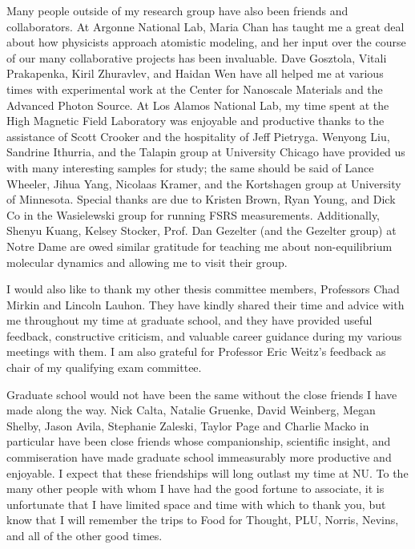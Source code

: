 \documentclass[12pt]{nuthesis}	%
\begin{document}
Many people outside of my research group have also been friends and collaborators. At Argonne National Lab, Maria Chan has taught me a great deal about how physicists approach atomistic modeling, and her input over the course of our many collaborative projects has been invaluable. Dave Gosztola, Vitali Prakapenka, Kiril Zhuravlev, and Haidan Wen have all helped me at various times with experimental work at the Center for Nanoscale Materials and the Advanced Photon Source. At Los Alamos National Lab, my time spent at the High Magnetic Field Laboratory was enjoyable and productive thanks to the assistance of Scott Crooker and the hospitality of Jeff Pietryga. Wenyong Liu, Sandrine Ithurria, and the Talapin group at University Chicago have provided us with many interesting samples for study; the same should be said of Lance Wheeler, Jihua Yang, Nicolaas Kramer, and the Kortshagen group at University of Minnesota. Special thanks are due to Kristen Brown, Ryan Young, and Dick Co in the Wasielewski group for running FSRS measurements. Additionally, Shenyu Kuang, Kelsey Stocker, Prof. Dan Gezelter (and the Gezelter group) at Notre Dame are owed similar gratitude for teaching me about non-equilibrium molecular dynamics and allowing me to visit their group. \par
I would also like to thank my other thesis committee members, Professors Chad Mirkin and Lincoln Lauhon. They have kindly shared their time and advice with me throughout my time at graduate school, and they have provided useful feedback, constructive criticism, and valuable career guidance during my various meetings with them. I am also grateful for Professor Eric Weitz's feedback as chair of my qualifying exam committee.\par
Graduate school would not have been the same without the close friends I have made along the way. Nick Calta, Natalie Gruenke, David Weinberg, Megan Shelby, Jason Avila, Stephanie Zaleski, Taylor Page and Charlie Macko in particular have been close friends whose companionship, scientific insight, and commiseration have made graduate school immeasurably more productive and enjoyable. I expect that these friendships will long outlast my time at NU. To the many other people with whom I have had the good fortune to associate, it is unfortunate that I have limited space and time with which to thank you, but know that I will remember the trips to Food for Thought, PLU, Norris, Nevins, and all of the other good times. \par
\end{document}
